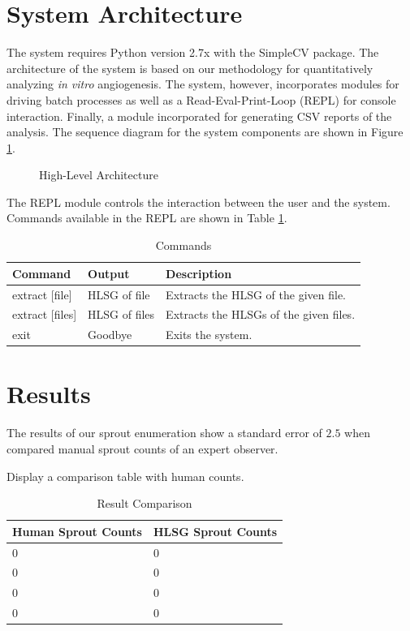 \documentclass{sig-alternate}
\newcommand{\invitro}{\emph{in vitro} }
\begin{document}
\section{System Architecture} %
\label{sec:System Architecture}
	The system requires Python version 2.7x with the SimpleCV package. The
	architecture of the system is based on our methodology for
	quantitatively analyzing \invitro angiogenesis. The system, however,
	incorporates modules for driving batch processes as well as a
	Read-Eval-Print-Loop (REPL) for console interaction. Finally, a module
	incorporated for generating CSV reports of the analysis. The sequence
	diagram for the system components are shown in Figure
	\ref{fig:sysarch}.
	\begin{figure}[ht!]
		\centering
		
		\caption{High-Level Architecture}
		\label{fig:sysarch}
	\end{figure}

	The REPL module controls the interaction between the user and the
	system. Commands available in the REPL are shown in Table
	\ref{tab:commands}.
	\begin{table}[h!]
		\begin{tabular}{| l | l | p{4cm} |}
			\hline
			\textbf{Command} & \textbf{Output} & \textbf{Description} \\\hline
			extract [file] & HLSG of file & Extracts the HLSG of the given file. \\\hline
			extract [files] & HLSG of files & Extracts the HLSGs of the given files. \\\hline
			exit & Goodbye & Exits the system. \\\hline
		\end{tabular}
		\caption{Commands}
		\label{tab:commands}
	\end{table}

\section{Results} %
\label{sec:Results}
	The results of our sprout enumeration show a standard error of $2.5$
	when compared manual sprout counts of an expert observer.

	Display a comparison table with human counts.
	\begin{table}[h!]
		\centering
		\begin{tabular}{| l | l |}
			\hline
			\textbf{Human Sprout Counts} & \textbf{HLSG Sprout Counts} \\\hline
			0 & 0 \\\hline
			0 & 0 \\\hline
			0 & 0 \\\hline
			0 & 0 \\\hline
		\end{tabular}
		\caption{Result Comparison}
		\label{tab:resultcomp}
	\end{table}
\end{document}
